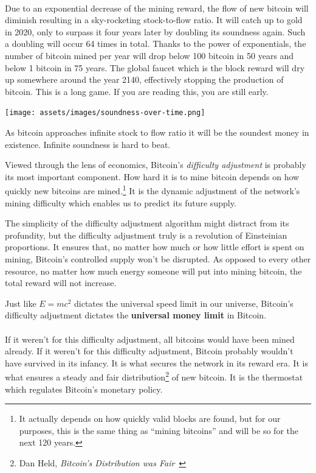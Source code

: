 \paragraph{}
Due to an exponential decrease of the mining reward, the flow of new
bitcoin will diminish resulting in a sky-rocketing stock-to-flow ratio.
It will catch up to gold in 2020, only to surpass it four years later by
doubling its soundness again. Such a doubling will occur 64 times in
total. Thanks to the power of exponentials, the number of bitcoin mined
per year will drop below 100 bitcoin in 50 years and below 1 bitcoin in
75 years. The global faucet which is the block reward will dry up
somewhere around the year 2140, effectively stopping the production of
bitcoin. This is a long game. If you are reading this, you are still
early.

\begin{center}
  \texttt{[image: assets/images/soundness-over-time.png]}
  \label{fig:soundness-over-time}
\end{center}

As bitcoin approaches infinite stock to flow ratio it will be the
soundest money in existence. Infinite soundness is hard to beat.

Viewed through the lens of economics, Bitcoin's \textit{difficulty adjustment}
is probably its most important component. How hard it is to mine bitcoin depends
on how quickly new bitcoins are mined.\footnote{It actually depends on how
quickly valid blocks are found, but for our purposes, this is the same thing as
\enquote{mining bitcoins} and will be so for the next 120 years.} It is the dynamic
adjustment of the network's mining difficulty which enables us to predict its
future supply.

The simplicity of the difficulty adjustment algorithm might distract
from its profundity, but the difficulty adjustment truly is a revolution
of Einsteinian proportions. It ensures that, no matter how much or how
little effort is spent on mining, Bitcoin's controlled supply won't be
disrupted. As opposed to every other resource, no matter how much
energy someone will put into mining bitcoin, the total reward will not
increase.

Just like $E=mc^2$ dictates the universal speed limit in our universe,
Bitcoin's difficulty adjustment dictates the \textbf{universal money limit}
in Bitcoin.

\paragraph{}
If it weren't for this difficulty adjustment, all bitcoins would have been mined
already. If it weren't for this difficulty adjustment, Bitcoin probably wouldn't
have survived in its infancy. It is what secures the network in its reward era.
It is what ensures a steady and fair distribution\footnote{Dan Held,
\textit{Bitcoin's Distribution was Fair}~\cite{distribution-was-fair}} of new
bitcoin. It is the thermostat which regulates Bitcoin's monetary policy.

